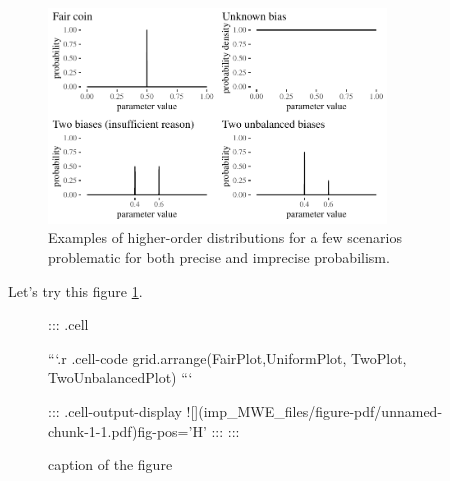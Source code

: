 \documentclass[
  letterpaper,
  DIV=11,
  numbers=noendperiod]{scrartcl}
\begin{document}
\begin{figure}

{\centering \includegraphics[width=0.8\textwidth,height=\textheight]{imp_MWE_files/figure-pdf/fig-evidenceResponse-1.pdf}

}

\caption{\label{fig-evidenceResponse}Examples of higher-order
distributions for a few scenarios problematic for both precise and
imprecise probabilism.}

\end{figure}

Let's try this figure \ref{fig-evidenceResponse}.

\begin{figure}


::: {.cell}

```{.r .cell-code}
grid.arrange(FairPlot,UniformPlot, TwoPlot, TwoUnbalancedPlot)
```

::: {.cell-output-display}
![](imp_MWE_files/figure-pdf/unnamed-chunk-1-1.pdf){fig-pos='H'}
:::
:::


\label{fig-theFigure}
\caption{caption of the figure}
\end{figure}
\end{document}
